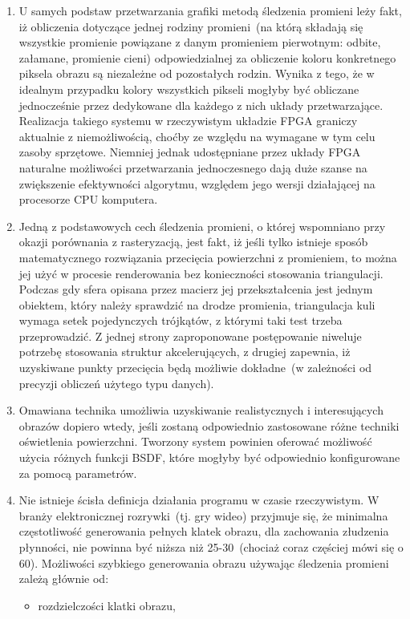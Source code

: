\begin{enumerate}
\item U samych podstaw przetwarzania grafiki metodą śledzenia promieni leży fakt, iż obliczenia dotyczące jednej rodziny promieni~(na którą składają się wszystkie promienie powiązane z danym promieniem pierwotnym: odbite, załamane, promienie cieni) odpowiedzialnej za obliczenie koloru konkretnego piksela obrazu są niezależne od pozostałych rodzin. Wynika z tego, że w idealnym przypadku kolory wszystkich pikseli mogłyby być obliczane jednocześnie przez dedykowane dla każdego z nich układy przetwarzające. Realizacja takiego systemu w rzeczywistym układzie FPGA graniczy aktualnie z niemożliwością, choćby ze względu na wymagane w tym celu zasoby sprzętowe. Niemniej jednak udostępniane przez układy FPGA naturalne możliwości przetwarzania jednoczesnego dają duże szanse na zwiększenie efektywności algorytmu, względem jego wersji działającej na procesorze CPU komputera.
\item Jedną z podstawowych cech śledzenia promieni, o której wspomniano przy okazji porównania z rasteryzacją, jest fakt, iż jeśli tylko istnieje sposób matematycznego rozwiązania przecięcia powierzchni z promieniem, to można jej użyć w procesie renderowania bez konieczności stosowania triangulacji. Podczas gdy sfera opisana przez macierz jej przekształcenia jest jednym obiektem, który należy sprawdzić na drodze promienia, triangulacja kuli wymaga setek pojedynczych trójkątów, z którymi taki test trzeba przeprowadzić. Z jednej strony zaproponowane postępowanie niweluje potrzebę stosowania struktur akcelerujących, z drugiej zapewnia, iż uzyskiwane punkty przecięcia będą możliwie dokładne~(w zależności od precyzji obliczeń użytego typu danych).
\item Omawiana technika umożliwia uzyskiwanie realistycznych i interesujących obrazów dopiero wtedy, jeśli zostaną odpowiednio zastosowane różne techniki oświetlenia powierzchni. Tworzony system powinien oferować możliwość użycia różnych funkcji BSDF, które mogłyby być odpowiednio konfigurowane za pomocą parametrów.
\item Nie istnieje ścisła definicja działania programu w czasie rzeczywistym. W branży elektronicznej rozrywki~(tj. gry wideo) przyjmuje się, że minimalna częstotliwość generowania pełnych klatek obrazu, dla zachowania złudzenia płynności, nie powinna być niższa niż 25-30~(chociaż coraz częściej mówi się o 60). Możliwości szybkiego generowania obrazu używając śledzenia promieni zależą głównie od:
\begin{itemize}
\item rozdzielczości klatki obrazu,

\end{itemize}
\end{enumerate}
